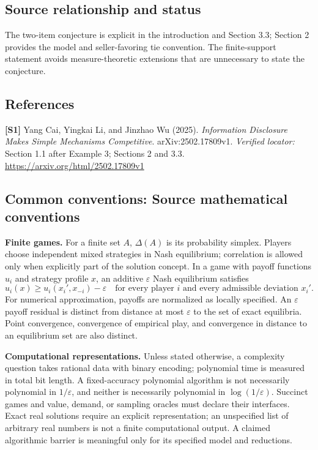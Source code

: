 \documentclass[11pt,a4paper]{article}
\begin{document}
\subsection*{Source relationship and status}
The two-item conjecture is explicit in the introduction and Section 3.3; Section 2 provides the model and seller-favoring tie convention. The finite-support statement avoids measure-theoretic extensions that are unnecessary to state the conjecture.
\subsection*{References}
\begingroup\footnotesize\raggedright
\textbf{[S1]} Yang Cai, Yingkai Li, and Jinzhao Wu (2025). \emph{Information Disclosure Makes Simple Mechanisms Competitive}. arXiv:2502.17809v1. \textit{Verified locator:} Section 1.1 after Example 3; Sections 2 and 3.3. \url{https://arxiv.org/html/2502.17809v1}
\par\endgroup

\subsection*{Common conventions: Source mathematical conventions}

\textbf{Finite games.} For a finite set $A$, $\Delta(A)$ is its probability
simplex. Players choose independent mixed strategies in Nash equilibrium;
correlation is allowed only when explicitly part of the solution concept.
In a game with payoff functions $u_i$ and strategy profile $x$, an additive
$\varepsilon$ Nash equilibrium satisfies
\[
 u_i(x)\geq u_i(x_i',x_{-i})-\varepsilon
 \quad\text{for every player $i$ and every admissible deviation $x_i'$}.
\]
For numerical approximation, payoffs are normalized as locally specified.
An $\varepsilon$ payoff residual is distinct from distance at most
$\varepsilon$ to the set of exact equilibria. Point convergence, convergence
of empirical play, and convergence in distance to an equilibrium set are
also distinct.

\textbf{Computational representations.} Unless stated otherwise, a complexity
question takes rational data with binary encoding; polynomial time is measured
in total bit length. A fixed-accuracy polynomial algorithm is not necessarily
polynomial in $1/\varepsilon$, and neither is necessarily polynomial in
$\log(1/\varepsilon)$. Succinct games and value, demand, or sampling oracles
must declare their interfaces. Exact real solutions require an explicit
representation; an unspecified list of arbitrary real numbers is not a
finite computational output. A claimed algorithmic barrier is meaningful
only for its specified model and reductions.
\end{document}
